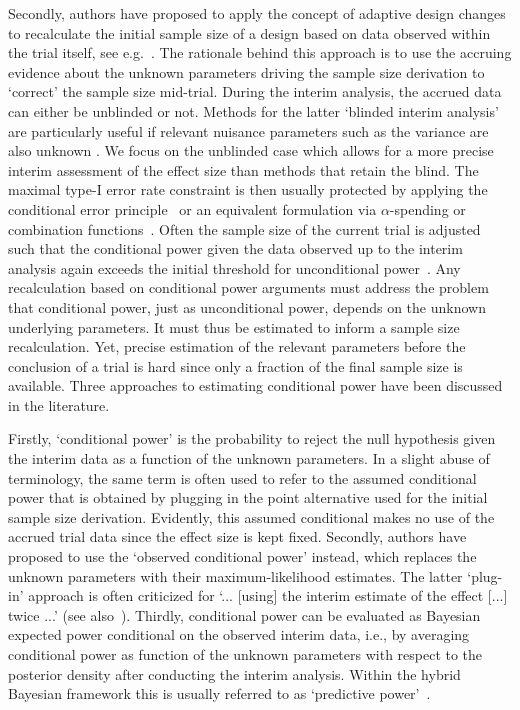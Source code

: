 \documentclass{article}
\begin{document}
Secondly, authors have proposed to apply the concept of adaptive design changes
to recalculate the initial sample size of a design based on data observed 
within the trial itself, see e.g.~\citet{bauer2016}.
The rationale behind this approach is to use the accruing evidence about the unknown parameters driving the sample size derivation to 
`correct' the sample size mid-trial. 
During the interim analysis, the accrued data can either be unblinded
or not.
Methods for the latter `blinded interim analysis' are particularly useful if relevant nuisance parameters such as the variance are also unknown \citep{birkett1994internal,bauer2016}.
We focus on the unblinded case which allows for a more precise 
interim assessment of the effect size than methods that retain 
the blind. 
The maximal type-I error rate constraint is then usually protected by 
applying the conditional error principle~\citep{muller2004,brannath2012}
or an equivalent formulation via $\alpha$-spending or 
combination functions~\citep{bauer2016}.
Often the sample size of the current 
trial is adjusted such that the conditional power given the data observed up to the
interim analysis again exceeds the initial threshold for unconditional 
power~\citep{proschan1995}.
Any recalculation based on conditional power arguments must
address the problem that conditional power, 
just as unconditional power, 
depends on the unknown underlying parameters.
It must thus be
estimated to inform a sample size recalculation.
Yet, precise estimation of the relevant parameters before the conclusion of a trial is hard since only a fraction of the final sample size is available.
Three approaches to estimating conditional power have been discussed in the literature.

Firstly, 
`conditional power' is the probability to reject the null hypothesis given the interim data as a function of the unknown parameters.
In a slight abuse of terminology, the same term is often used to refer to
the assumed conditional power that is obtained by plugging in the 
point alternative used for the initial sample size derivation. 
Evidently, this assumed conditional makes no use of the accrued trial
data since the effect size is kept fixed.
Secondly,
authors have proposed to use the `observed conditional power' instead, which replaces the unknown parameters with their maximum-likelihood estimates.
The latter `plug-in' approach is often criticized for 
`... [using] the interim estimate of the effect [...] twice ...' \citep[p.~330]{bauer2016} (see also~\cite{bauer2006}).
Thirdly, 
conditional power can be evaluated as Bayesian expected power conditional on the observed interim data, 
i.e., by averaging conditional power as function of the unknown 
parameters with respect to the posterior density 
after conducting the interim analysis. 
Within the hybrid Bayesian framework this is usually referred to as 
`predictive power'~\citep{spiegelhalter1994,bauer2016}.
\end{document}
